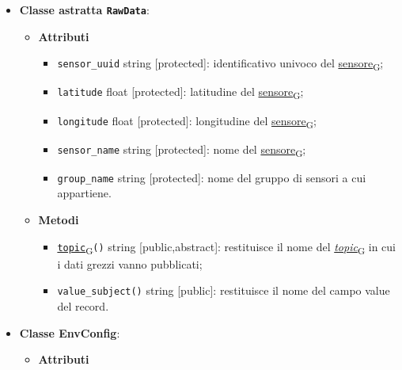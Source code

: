 \begin{itemize}
	\item \textbf{Classe astratta \texttt{RawData}}:
	      \begin{itemize}
		      \item \textbf{Attributi}
		            \begin{itemize}
			            \item \texttt{sensor\_uuid} string [protected]: identificativo univoco del \href{https://7last.github.io/docs/pb/documentazione-interna/glossario\#sensore}{sensore\textsubscript{G}};
			            \item \texttt{latitude} float [protected]: latitudine del \href{https://7last.github.io/docs/pb/documentazione-interna/glossario\#sensore}{sensore\textsubscript{G}};
			            \item \texttt{longitude} float [protected]: longitudine del \href{https://7last.github.io/docs/pb/documentazione-interna/glossario\#sensore}{sensore\textsubscript{G}};
			            \item \texttt{sensor\_name} string [protected]: nome del \href{https://7last.github.io/docs/pb/documentazione-interna/glossario\#sensore}{sensore\textsubscript{G}};
			            \item \texttt{group\_name} string [protected]: nome del gruppo di sensori a cui appartiene.
		            \end{itemize}
		      \item \textbf{Metodi}
		            \begin{itemize}
			            \item \href{https://7last.github.io/docs/pb/documentazione-interna/glossario\#topic}{\texttt{topic}\textsubscript{G}}\texttt{()} string [public,abstract]: restituisce il nome del \href{https://7last.github.io/docs/pb/documentazione-interna/glossario\#topic}{\textit{topic}\textsubscript{G}} in cui i dati grezzi vanno pubblicati;
			            \item \texttt{value\_subject()} string [public]: restituisce il nome del campo value del record.
		            \end{itemize}
	      \end{itemize}
	\item \textbf{Classe EnvConfig}:
	      \begin{itemize}
		      \item \textbf{Attributi}
		            \begin{itemize}

\end{itemize}
\end{itemize}
\end{itemize}
